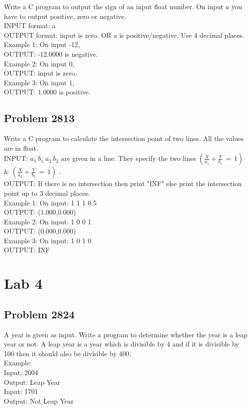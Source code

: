Write a C program to output the sign of an input float number. On input $a$ you have to output positive, zero or negative.
\\INPUT format: a
\\OUTPUT format: input is zero. OR a is positive/negative. Use 4 decimal places.
\\Example 1: On input -12,
\\OUTPUT: -12.0000 is negative.
\\Example 2: On input 0,
\\OUTPUT: input is zero.
\\Example 3: On input 1,
\\OUTPUT: 1.0000 is positive.

\subsection{Problem 2813}

Write a C program to calculate the intersection point of two lines. All the values are in float.
\\INPUT: $a_1 \: b_1\: a_2\: b_2$ are given in a line. They specify the two lines $(\frac{X}{a_1} + \frac{Y}{b_1}  \,=\, 1 )$ \& $(\frac{X}{a_2} + \frac{Y}{b_2} \,=\, 1 )$ .
\\OUTPUT: If there is no intersection then print "INF" else print the intersection point up to 3 decimal places.
\\Example 1: On input: 1 1 1 0.5
\\OUTPUT: (1.000,0.000)
\\Example 2: On input: 1 0 0 1
\\OUTPUT: (0.000,0.000)
\\Example 3: On input: 1 0 1 0
\\OUTPUT: INF

\section{Lab 4}

\subsection{Problem 2824}

A year is given as input. Write a program to determine whether the year is a leap year or not. A leap year is a year which is divisible by 4 and if it is divisible by 100 then it should also be divisible by 400.
\\Example:
\\Input: 2004
\\Output: Leap Year
\\Input: 1701
\\Output: Not Leap Year

